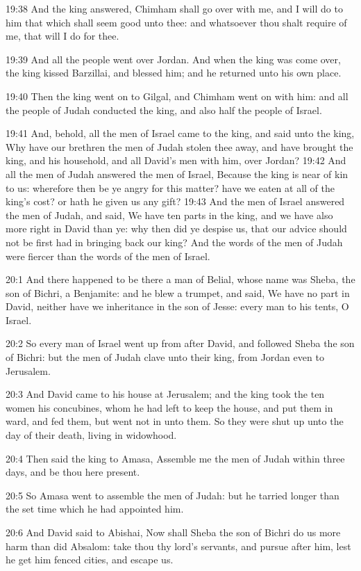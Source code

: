 19:38 And the king answered, Chimham shall go over with me, and I will
do to him that which shall seem good unto thee: and whatsoever thou
shalt require of me, that will I do for thee.

19:39 And all the people went over Jordan. And when the king was come
over, the king kissed Barzillai, and blessed him; and he returned unto
his own place.

19:40 Then the king went on to Gilgal, and Chimham went on with him:
and all the people of Judah conducted the king, and also half the
people of Israel.

19:41 And, behold, all the men of Israel came to the king, and said
unto the king, Why have our brethren the men of Judah stolen thee
away, and have brought the king, and his household, and all David's
men with him, over Jordan?  19:42 And all the men of Judah answered
the men of Israel, Because the king is near of kin to us: wherefore
then be ye angry for this matter? have we eaten at all of the king's
cost? or hath he given us any gift?  19:43 And the men of Israel
answered the men of Judah, and said, We have ten parts in the king,
and we have also more right in David than ye: why then did ye despise
us, that our advice should not be first had in bringing back our king?
And the words of the men of Judah were fiercer than the words of the
men of Israel.

20:1 And there happened to be there a man of Belial, whose name was
Sheba, the son of Bichri, a Benjamite: and he blew a trumpet, and
said, We have no part in David, neither have we inheritance in the son
of Jesse: every man to his tents, O Israel.

20:2 So every man of Israel went up from after David, and followed
Sheba the son of Bichri: but the men of Judah clave unto their king,
from Jordan even to Jerusalem.

20:3 And David came to his house at Jerusalem; and the king took the
ten women his concubines, whom he had left to keep the house, and put
them in ward, and fed them, but went not in unto them. So they were
shut up unto the day of their death, living in widowhood.

20:4 Then said the king to Amasa, Assemble me the men of Judah within
three days, and be thou here present.

20:5 So Amasa went to assemble the men of Judah: but he tarried longer
than the set time which he had appointed him.

20:6 And David said to Abishai, Now shall Sheba the son of Bichri do
us more harm than did Absalom: take thou thy lord's servants, and
pursue after him, lest he get him fenced cities, and escape us.

